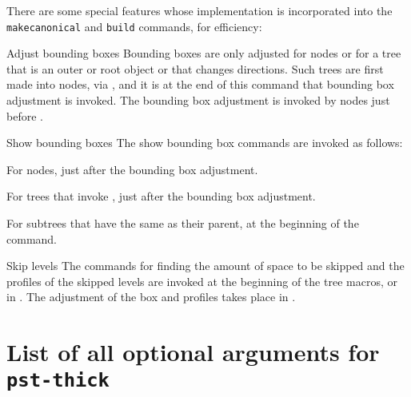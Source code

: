\documentclass[11pt,english,BCOR10mm,DIV12,bibliography=totoc,parskip=false,smallheadings
    headexclude,footexclude,oneside]{pst-doc}
\begin{document}
There are some special features whose implementation is incorporated into the \verb=makecanonical= and \verb=build= 
commands, for efficiency:
\begin{compactdesc}
\item[Adjust bounding boxes]
  Bounding boxes are only adjusted for nodes or for a tree that is an outer or root object or that changes 
  directions. Such trees are first made into nodes, via , and it is at the end of 
  this command that bounding box adjustment is invoked. The bounding box adjustment is invoked by nodes just 
  before .

\item[Show bounding boxes]
 The show bounding box commands are invoked as follows:
 \begin{compactitem}
   \item For nodes, just after the bounding box adjustment.
   \item For trees that invoke , just after the bounding box adjustment.
   \item For subtrees that have the same  as their parent, at the beginning 
    of the  command.
 \end{compactitem}

\item[Skip levels]
 The commands for finding the amount of space to be skipped and the profiles of the skipped levels are invoked 
 at the beginning of the tree macros, or in . The adjustment of the box and profiles 
 takes place in .
\end{compactdesc}



\clearpage
\section{List of all optional arguments for \texttt{pst-thick}}


\nocite{*}
\bgroup
\RaggedRight


\egroup

\printindex
\end{document}
